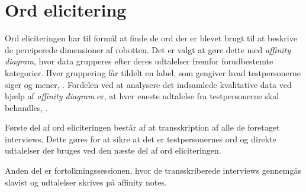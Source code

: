 \section*{Ord elicitering}
\label{OrdElicitering}

Ord eliciteringen har til formål at finde de ord der er blevet brugt til at beskrive de perciperede dimensioner af robotten. 
Det er valgt at gøre dette med \textit{affinity diagram}, hvor data grupperes efter deres udtalelser fremfor forudbestemte kategorier. Hver gruppering får tildelt en label, som gengiver hvad testpersonerne siger og mener, \parencite[s. 159]{Book:BuildingAnAffinity}. Fordelen ved at analysere det indsamlede kvalitative data ved hjælp af \textit{affinity diagram} er, at hver eneste udtalelse fra testpersonerne skal behandles, \parencite[s. 25]{PDF:ConsolidationIdeationAffinity}.

Første del af ord eliciteringen består af at transskription af alle de foretaget interviews. Dette gøres for at sikre at det er testpersonernes ord og direkte udtalelser der bruges ved den næste del af ord eliciteringen. 

Anden del er fortolkningssessionen, hvor de transskriberede interviews gennemgås slavist og udtalelser skrives på affinity notes. 
